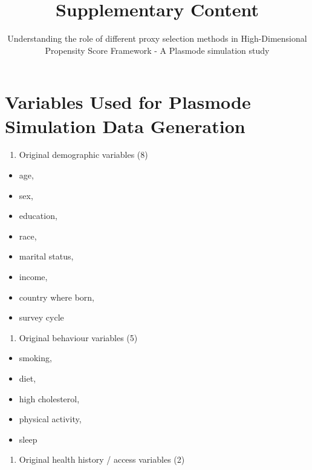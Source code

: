 \documentclass[
  10pt,
]{article}
\title{Supplementary Content}
\subtitle{Understanding the role of different proxy selection methods in
High-Dimensional Propensity Score Framework - A Plasmode simulation
study}
\author{}
\date{\vspace{-2.5em}}
\providecommand{\tightlist}{%
  \setlength{\itemsep}{0pt}\setlength{\parskip}{0pt}}
\begin{document}
\maketitle

\appendix
{}

\edef\tablename{\appendixname~\tablename}
\edef\figurename{\appendixname~\figurename}

\section{Variables Used for Plasmode Simulation Data
Generation}\label{variables-used-for-plasmode-simulation-data-generation}

\begin{enumerate}
\def\labelenumi{\arabic{enumi}.}
\tightlist
\item
  Original demographic variables (8)
\end{enumerate}

\begin{itemize}
\tightlist
\item
  age,
\item
  sex,
\item
  education,
\item
  race,
\item
  marital status,
\item
  income,
\item
  country where born,
\item
  survey cycle
\end{itemize}

\begin{enumerate}
\def\labelenumi{\arabic{enumi}.}
\setcounter{enumi}{1}
\tightlist
\item
  Original behaviour variables (5)
\end{enumerate}

\begin{itemize}
\tightlist
\item
  smoking,
\item
  diet,
\item
  high cholesterol,
\item
  physical activity,
\item
  sleep
\end{itemize}

\begin{enumerate}
\def\labelenumi{\arabic{enumi}.}
\setcounter{enumi}{2}
\tightlist
\item
  Original health history / access variables (2)
\end{enumerate}
\end{document}

